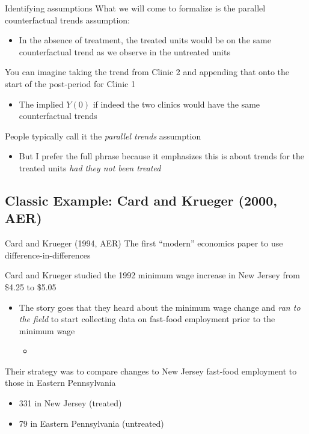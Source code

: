 \documentclass[aspectratio=169,t,11pt,table]{beamer}
\begin{document}
\begin{frame}{Identifying assumptions}
  What we will come to formalize is the \alert{parallel counterfactual trends} assumption:
  \begin{itemize}
    \item In the absence of treatment, the treated units would be on the same counterfactual trend as we observe in the untreated units
  \end{itemize}

  \bigskip
  You can imagine taking the trend from Clinic 2 and appending that onto the start of the post-period for Clinic 1
  \begin{itemize}
    \item The implied $Y(0)$ if indeed the two clinics would have the same counterfactual trends
  \end{itemize}

  \bigskip
  People typically call it the \emph{parallel trends} assumption
  \begin{itemize}
    \item But I prefer the full phrase because it emphasizes this is about trends for the treated units \emph{had they not been treated}
  \end{itemize}
\end{frame}


%   

\subsection{Classic Example: Card and Krueger (2000, AER)}

\begin{frame}{Card and Krueger (1994, AER)}
  The first ``modern'' economics paper to use difference-in-differences

  \bigskip
  Card and Krueger studied the 1992 minimum wage increase in New Jersey from \$4.25 to \$5.05
  \begin{itemize}
    \item The story goes that they heard about the minimum wage change and \emph{ran to the field} to start collecting data on fast-food employment prior to the minimum wage
    \begin{itemize}
      \item 
    \end{itemize}
  \end{itemize}

  \pause
  \bigskip
  Their strategy was to compare changes to New Jersey fast-food employment to those in Eastern Pennsylvania
  \begin{itemize}
    \item 331 in New Jersey (treated)
    \item 79 in Eastern Pennsylvania (untreated)
  \end{itemize}
\end{frame}
\end{document}
